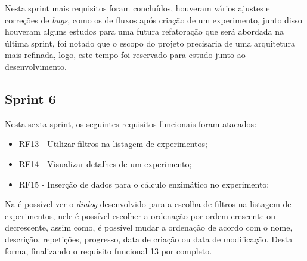Nesta sprint mais requisitos foram concluídos, houveram vários ajustes e correções de \textit{bugs}, como os de fluxos após criação de um experimento, junto disso houveram alguns estudos para uma futura refatoração que será abordada na última sprint, foi notado que o escopo do projeto precisaria de uma arquitetura mais refinada, logo, este tempo foi reservado para estudo junto ao desenvolvimento.  
 
\subsection{Sprint 6}\label{ssec:sprint6}
Nesta sexta sprint, os seguintes requisitos funcionais foram atacados:
\begin{itemize}
   \item RF13 - Utilizar filtros na listagem de experimentos;
   \item RF14 - Visualizar detalhes de um experimento;
   \item RF15 - Inserção de dados para o cálculo enzimático no experimento;
 \end{itemize}

Na  é possível ver o \textit{dialog} desenvolvido para a escolha de filtros na listagem de experimentos, nele é possível escolher a ordenação por ordem crescente ou decrescente, assim como, é possível mudar a ordenação de acordo com o nome, descrição, repetições, progresso, data de criação ou data de modificação. Desta forma, finalizando o requisito funcional 13 por completo.
 
